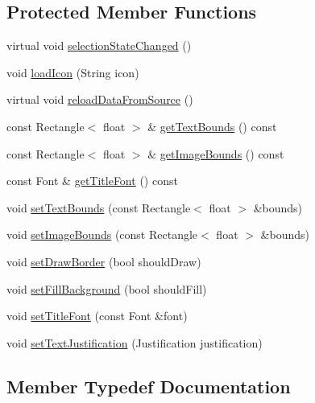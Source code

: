 \subsection*{Protected Member Functions}
\begin{DoxyCompactItemize}
\item 
virtual void \mbox{\hyperlink{classAppMenuButton_aabd4012101fc3f9d48ee816d5a1c5182}{selection\+State\+Changed}} ()
\item 
void \mbox{\hyperlink{classAppMenuButton_a8c3a08391a811b18631ce391f51bd081}{load\+Icon}} (String icon)
\item 
virtual void \mbox{\hyperlink{classAppMenuButton_ae25b2203f6d796af9ab7686d600f7f23}{reload\+Data\+From\+Source}} ()
\item 
const Rectangle$<$ float $>$ \& \mbox{\hyperlink{classAppMenuButton_ac7893a9e707238feb9fe367d6e444446}{get\+Text\+Bounds}} () const
\item 
const Rectangle$<$ float $>$ \& \mbox{\hyperlink{classAppMenuButton_a404859940108f1284c0b28f0b66d7567}{get\+Image\+Bounds}} () const
\item 
const Font \& \mbox{\hyperlink{classAppMenuButton_aa0659bfa4729f2a3ce5c62bbf1205fc9}{get\+Title\+Font}} () const
\item 
void \mbox{\hyperlink{classAppMenuButton_aee22a18243e83c0b5735c320d7461a8a}{set\+Text\+Bounds}} (const Rectangle$<$ float $>$ \&bounds)
\item 
void \mbox{\hyperlink{classAppMenuButton_a1a444d9d4016f407bc021774fcd62a36}{set\+Image\+Bounds}} (const Rectangle$<$ float $>$ \&bounds)
\item 
void \mbox{\hyperlink{classAppMenuButton_a67d3f396b0c87a25c67e1867d01bff73}{set\+Draw\+Border}} (bool should\+Draw)
\item 
void \mbox{\hyperlink{classAppMenuButton_abb921087445de1a6f25674ea36f26c8f}{set\+Fill\+Background}} (bool should\+Fill)
\item 
void \mbox{\hyperlink{classAppMenuButton_ab3368972b9d659cad06cc95586b4a63c}{set\+Title\+Font}} (const Font \&font)
\item 
void \mbox{\hyperlink{classAppMenuButton_ae6fc015caaa91b9c661dce2326e03e01}{set\+Text\+Justification}} (Justification justification)
\end{DoxyCompactItemize}


\subsection{Member Typedef Documentation}
\mbox{\label{classAppMenuButton_aeb692efb6a933970de8eac14e5e71544}} 
